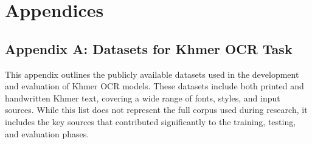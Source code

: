\appendix
\chapter*{Appendices}

\vspace{0.5cm}
\label{appendix-a}
\section*{Appendix A: Datasets for Khmer OCR Task}

This appendix outlines the publicly available datasets used in the development and evaluation of Khmer OCR models. These datasets include both printed and handwritten Khmer text, covering a wide range of fonts, styles, and input sources. While this list does not represent the full corpus used during research, it includes the key sources that contributed significantly to the training, testing, and evaluation phases.

